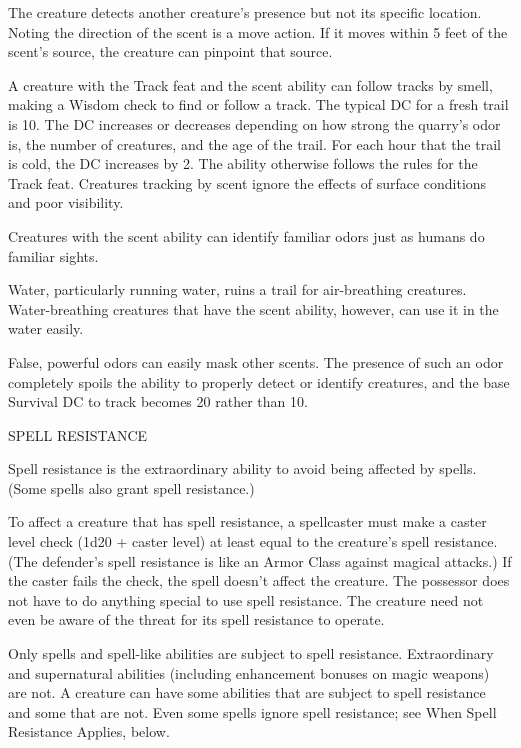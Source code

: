 \documentclass{article}
\begin{document}
The creature detects another creature's presence but not its specific location. 
Noting the direction of the scent is a move action. If it moves within 5 feet of 
the scent's source, the creature can pinpoint that source.

A creature with the Track feat and the scent ability can follow tracks by smell, 
making a Wisdom check to find or follow a track. The typical DC for a fresh trail 
is 10. The DC increases or decreases depending on how strong the quarry's odor 
is, the number of creatures, and the age of the trail. For each hour that the trail 
is cold, the DC increases by 2. The ability otherwise follows the rules for the 
Track feat. Creatures tracking by scent ignore the effects of surface conditions 
and poor visibility.

Creatures with the scent ability can identify familiar odors just as humans do 
familiar sights.

Water, particularly running water, ruins a trail for air-breathing creatures. Water-breathing 
creatures that have the scent ability, however, can use it in the water easily.

False, powerful odors can easily mask other scents. The presence of such an odor 
completely spoils the ability to properly detect or identify creatures, and the 
base Survival DC to track becomes 20 rather than 10.

\vspace{12pt}
SPELL RESISTANCE

Spell resistance is the extraordinary ability to avoid being affected by spells. 
(Some spells also grant spell resistance.)

To affect a creature that has spell resistance, a spellcaster must make a caster 
level check (1d20 + caster level) at least equal to the creature's spell resistance. 
(The defender's spell resistance is like an Armor Class against magical attacks.) 
If the caster fails the check, the spell doesn't affect the creature. The possessor 
does not have to do anything special to use spell resistance. The creature need 
not even be aware of the threat for its spell resistance to operate.

Only spells and spell-like abilities are subject to spell resistance. Extraordinary 
and supernatural abilities (including enhancement bonuses on magic weapons) are 
not. A creature can have some abilities that are subject to spell resistance and 
some that are not. Even some spells ignore spell resistance; see When Spell Resistance 
Applies, below. 
\end{document}
